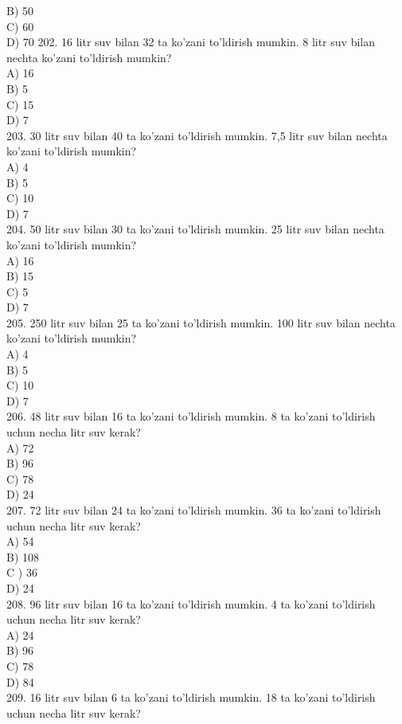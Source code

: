 B) 50\\
C) 60\\
D) 70
202. 16 litr suv bilan 32 ta ko'zani to'ldirish mumkin. 8 litr suv bilan nechta ko'zani to'ldirish mumkin?\\
A) 16\\
B) 5\\
C) 15\\
D) 7\\
203. 30 litr suv bilan 40 ta ko'zani to'ldirish mumkin. 7,5 litr suv bilan nechta ko'zani to'ldirish mumkin?\\
A) 4\\
B) 5\\
C) 10\\
D) 7\\
204. 50 litr suv bilan 30 ta ko'zani to'ldirish mumkin. 25 litr suv bilan nechta ko'zani to'ldirish mumkin?\\
A) 16\\
B) 15\\
C) 5\\
D) 7\\
205. 250 litr suv bilan 25 ta ko'zani to'ldirish mumkin. 100 litr suv bilan nechta ko'zani to'ldirish mumkin?\\
A) 4\\
B) 5\\
C) 10\\
D) 7\\
206. 48 litr suv bilan 16 ta ko'zani to'ldirish mumkin. 8 ta ko'zani to'ldirish uchun necha litr suv kerak?\\
A) 72\\
B) 96\\
C) 78\\
D) 24\\
207. 72 litr suv bilan 24 ta ko'zani to'ldirish mumkin. 36 ta ko'zani to'ldirish uchun necha litr suv kerak?\\
A) 54\\
B) 108\\
C ) 36\\
D) 24\\
208. 96 litr suv bilan 16 ta ko'zani to'ldirish mumkin. 4 ta ko'zani to'ldirish uchun necha litr suv kerak?\\
A) 24\\
B) 96\\
C) 78\\
D) 84\\
209. 16 litr suv bilan 6 ta ko'zani to'ldirish mumkin. 18 ta ko'zani to'ldirish uchun necha litr suv kerak?\\

